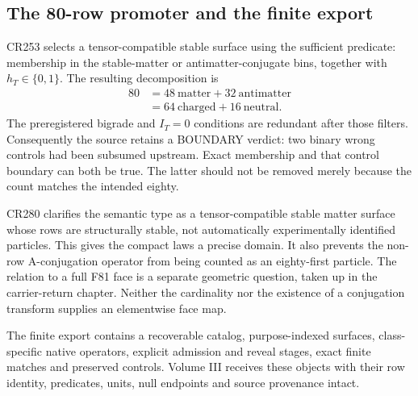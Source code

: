 \subsection{The 80-row promoter and the finite export}

CR253 selects a tensor-compatible stable surface using the sufficient predicate: membership in the stable-matter or antimatter-conjugate bins, together with $h_T\in\{0,1\}$. The resulting decomposition is
\begin{equation}
\begin{split}
80&=48\ \text{matter}+32\ \text{antimatter}\\
&=64\ \text{charged}+16\ \text{neutral}.
\end{split}
\end{equation}
The preregistered bigrade and $I_T=0$ conditions are redundant after those filters. Consequently the source retains a BOUNDARY verdict: two binary wrong controls had been subsumed upstream. Exact membership and that control boundary can both be true. The latter should not be removed merely because the count matches the intended eighty.

CR280 clarifies the semantic type as a tensor-compatible stable matter surface whose rows are structurally stable, not automatically experimentally identified particles. This gives the compact laws a precise domain. It also prevents the non-row A-conjugation operator from being counted as an eighty-first particle. The relation to a full F81 face is a separate geometric question, taken up in the carrier-return chapter. Neither the cardinality nor the existence of a conjugation transform supplies an elementwise face map.

The finite export contains a recoverable catalog, purpose-indexed surfaces, class-specific native operators, explicit admission and reveal stages, exact finite matches and preserved controls. Volume III receives these objects with their row identity, predicates, units, null endpoints and source provenance intact.
